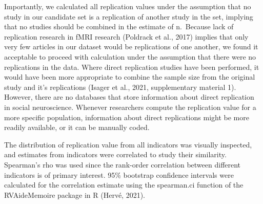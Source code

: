 \documentclass[
  man,floatsintext]{apa6}
\begin{document}
Importantly, we calculated all replication values under the assumption that no study in our candidate set is a replication of another study in the set, implying that no studies should be combined in the estimate of n.~Because lack of replication research in fMRI research (Poldrack et al., 2017) implies that only very few articles in our dataset would be replications of one another, we found it acceptable to proceed with calculation under the assumption that there were no replications in the data. Where direct replication studies have been performed, it would have been more appropriate to combine the sample size from the original study and it's replications (Isager et al., 2021, supplementary material 1). However, there are no databases that store information about direct replication in social neuroscience. Whenever researchers compute the replication value for a more specific population, information about direct replications might be more readily available, or it can be manually coded.

The distribution of replication value from all indicators was visually inspected, and estimates from indicators were correlated to study their similarity. Spearman's rho was used since the rank-order correlation between different indicators is of primary interest. 95\% bootstrap confidence intervals were calculated for the correlation estimate using the spearman.ci function of the RVAideMemoire package in R (Hervé, 2021).
\end{document}
